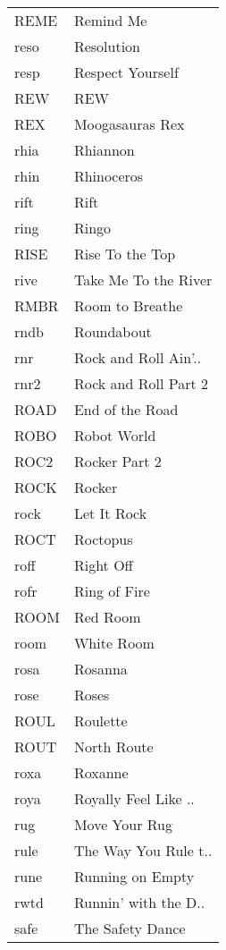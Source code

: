 \begin{supertabular}{ll}
 REME &             Remind Me \\
 reso &            Resolution \\
 resp &      Respect Yourself \\
  REW &                   REW \\
  REX &       Moogasauras Rex \\
 rhia &              Rhiannon \\
 rhin &            Rhinoceros \\
 rift &                  Rift \\
 ring &                 Ringo \\
 RISE &       Rise To the Top \\
 rive &  Take Me To the River \\
 RMBR &       Room to Breathe \\
 rndb &            Roundabout \\
  rnr &  Rock and Roll Ain'.. \\
 rnr2 &  Rock and Roll Part 2 \\
 ROAD &       End of the Road \\
 ROBO &           Robot World \\
 ROC2 &         Rocker Part 2 \\
 ROCK &                Rocker \\
 rock &           Let It Rock \\
 ROCT &              Roctopus \\
 roff &             Right Off \\
 rofr &          Ring of Fire \\
 ROOM &              Red Room \\
 room &            White Room \\
 rosa &               Rosanna \\
 rose &                 Roses \\
 ROUL &              Roulette \\
 ROUT &           North Route \\
 roxa &               Roxanne \\
 roya &  Royally Feel Like .. \\
  rug &         Move Your Rug \\
 rule &  The Way You Rule t.. \\
 rune &      Running on Empty \\
 rwtd &  Runnin' with the D.. \\
 safe &      The Safety Dance \\

\end{supertabular}
